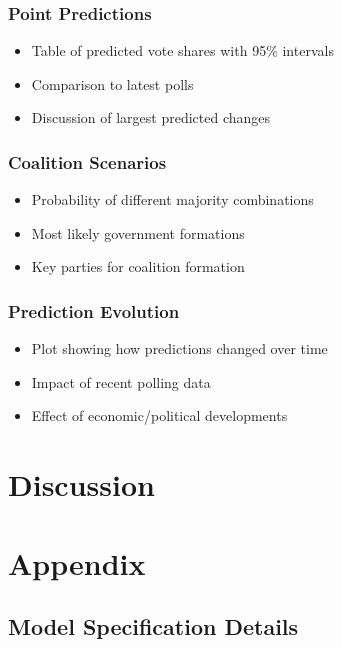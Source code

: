 \documentclass[
  letterpaper,
  DIV=11,
  numbers=noendperiod]{scrartcl}
\providecommand{\tightlist}{%
  \setlength{\itemsep}{0pt}\setlength{\parskip}{0pt}}\usepackage{longtable,booktabs,array}
\begin{document}
\subsubsection{Point Predictions}\label{point-predictions}

\begin{itemize}
\tightlist
\item
  Table of predicted vote shares with 95\% intervals
\item
  Comparison to latest polls
\item
  Discussion of largest predicted changes
\end{itemize}

\subsubsection{Coalition Scenarios}\label{coalition-scenarios}

\begin{itemize}
\tightlist
\item
  Probability of different majority combinations
\item
  Most likely government formations
\item
  Key parties for coalition formation
\end{itemize}

\subsubsection{Prediction Evolution}\label{prediction-evolution}

\begin{itemize}
\tightlist
\item
  Plot showing how predictions changed over time
\item
  Impact of recent polling data
\item
  Effect of economic/political developments
\end{itemize}

\section{Discussion}\label{discussion}

\section{Appendix}\label{appendix}

\subsection{Model Specification
Details}\label{model-specification-details}
\end{document}
